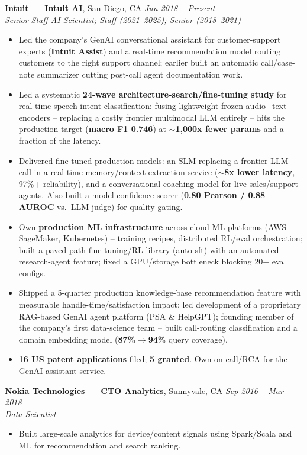 \documentclass[10pt]{article}
\begin{document}
\textbf{Intuit --- Intuit AI}, San Diego, CA \hfill \emph{Jun 2018 -- Present}\\
\emph{Senior Staff AI Scientist; Staff (2021--2025); Senior (2018--2021)}
\begin{itemize}
  \item Led the company's GenAI conversational assistant for customer-support experts (\textbf{Intuit Assist}) and a real-time recommendation model routing customers to the right support channel; earlier built an automatic call/case-note summarizer cutting post-call agent documentation work.
  \item Led a systematic \textbf{24-wave architecture-search/fine-tuning study} for real-time speech-intent classification: fusing lightweight frozen audio+text encoders -- replacing a costly frontier multimodal LLM entirely -- hits the production target (\textbf{macro F1 0.746}) at \textbf{$\sim$1,000x fewer params} and a fraction of the latency.
  \item Delivered fine-tuned production models: an SLM replacing a frontier-LLM call in a real-time memory/context-extraction service (\textbf{$\sim$8x lower latency}, 97\%+ reliability), and a conversational-coaching model for live sales/support agents. Also built a model confidence scorer (\textbf{0.80 Pearson / 0.88 AUROC} vs.\ LLM-judge) for quality-gating.
  \item Own \textbf{production ML infrastructure} across cloud ML platforms (AWS SageMaker, Kubernetes) -- training recipes, distributed RL/eval orchestration; built a paved-path fine-tuning/RL library (auto-sft) with an automated-research-agent feature; fixed a GPU/storage bottleneck blocking 20+ eval configs.
  \item Shipped a 5-quarter production knowledge-base recommendation feature with measurable handle-time/satisfaction impact; led development of a proprietary RAG-based GenAI agent platform (PSA \& HelpGPT); founding member of the company's first data-science team -- built call-routing classification and a domain embedding model (\textbf{87\%$\rightarrow$94\%} query coverage).
  \item \textbf{16 US patent applications} filed; \textbf{5 granted}. Own on-call/RCA for the GenAI assistant service.
\end{itemize}

\textbf{Nokia Technologies --- CTO Analytics}, Sunnyvale, CA \hfill \emph{Sep 2016 -- Mar 2018}\\
\emph{Data Scientist}
\begin{itemize}
  \item Built large-scale analytics for device/content signals using Spark/Scala and ML for recommendation and search ranking.
\end{itemize}
\end{document}
